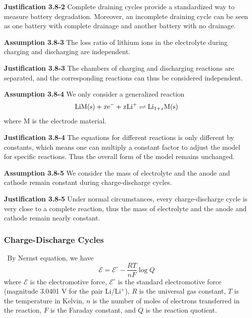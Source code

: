 \documentclass[12pt]{article}
\begin{document}
\noindent \textbf{Justification 3.8-2} \quad Complete draining cycles provide a standardized way to measure battery degradation. Moreover, an incomplete draining cycle can be seen as one battery with complete drainage and another battery with no drainage.

\noindent \textbf{Assumption 3.8-3} \quad The loss ratio of lithium ions in the electrolyte during charging and discharging are independent.

\noindent \textbf{Justification 3.8-3} \quad The chambers of charging and discharging reactions are separated, and the corresponding reactions can thus be considered independent.

\noindent \textbf{Assumption 3.8-4} \quad We only consider a generalized reaction
\begin{equation}
	\rm LiM(s)+ \mathit xe^- + \mathit xLi^+ \rightleftharpoons Li_{1+\mathit x}M(s)
\end{equation}
where M is the electrode material.

\noindent \textbf{Justification 3.8-4} \quad The equations for different reactions is only different by constants, which means one can multiply a constant factor to adjust the model for specific reactions. Thus the overall form of the model remains unchanged.

\noindent \textbf{Assumption 3.8-5} \quad We consider the mass of electrolyte and the anode and cathode remain constant during charge-discharge cycles.

\noindent \textbf{Justification 3.8-5} \quad Under normal circumstances, every charge-discharge cycle is very close to a complete reaction, thus the mass of electrolyte and the anode and cathode remain nearly constant.

\subsubsection{Charge-Discharge Cycles}

\quad \, By Nernst equation, we have
\begin{equation}
	\mathcal E=\mathcal E^{\circ}-\frac{RT}{nF}\log Q
\end{equation}
where $\mathcal E$ is the electromotive force, $\mathcal E^{\circ}$ is the standard electromotive force (magnitude 3.0401 V for the pair Li/Li$^+$), $R$ is the universal gas constant, $T$ is the temperature in Kelvin, $n$ is the number of moles of electrons transferred in the reaction, $F$ is the Faraday constant, and $Q$ is the reaction quotient.
\end{document}
